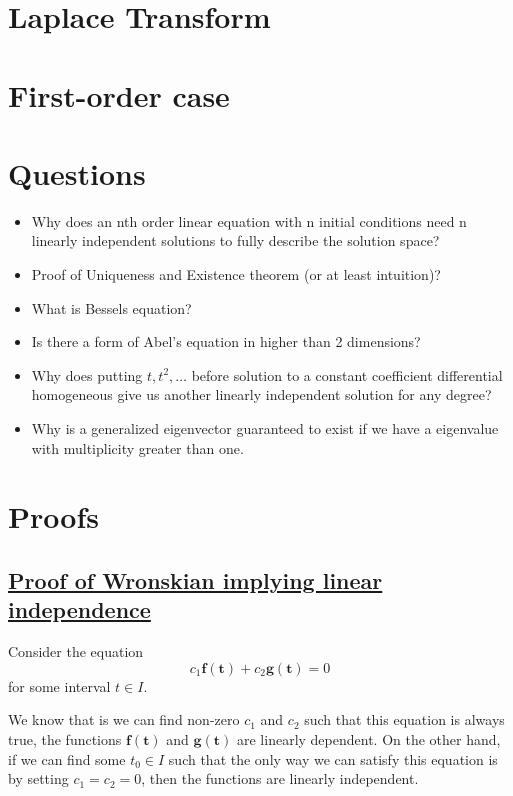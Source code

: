 \documentclass{report}
\begin{document}
\chapter{Laplace Transform}

\chapter{First-order case}

\chapter{Questions}
\begin{itemize}
    \item Why does an nth order linear equation with n initial conditions need n linearly independent solutions to fully describe the solution space?
    \item Proof of Uniqueness and Existence theorem (or at least intuition)?
    \item What is Bessels equation?
    \item Is there a form of Abel's equation in higher than 2 dimensions?
    \item Why does putting $t, t^2, \dots $ before solution to a constant coefficient differential homogeneous give us another linearly independent solution for any degree?
    \item Why is a generalized eigenvector guaranteed to exist if we have a eigenvalue with multiplicity greater than one.
\end{itemize}

\chapter{Proofs}
\section{\hyperref[th:wronLinInd]{Proof of Wronskian implying linear independence}}
\label{sec:prWronLinInd}
Consider the equation 
$$c_1\bm{f(t)} + c_2\bm{g(t)} = 0$$ 
for some interval $t \in I$. 

We know that is we can find non-zero $c_1$ and $c_2$ such that this equation is always true, the functions $\bm{f(t)}$ and $\bm{g(t)}$ are linearly dependent. On the other hand, if we can find some $t_0 \in I$ such that the only way we can satisfy this equation is by setting $c_1 = c_2 = 0$, then the functions are linearly independent.
\end{document}
